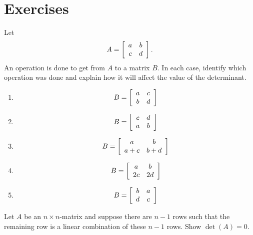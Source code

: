 \documentclass{ximera}
\author{Zack Reed}
\begin{document}
\section*{Exercises}


  Let
  \begin{equation*}
    A = \startmat{cc}
      a & b \\
      c & d \\
    \stopmat.
  \end{equation*}
  An operation is done to get from $A$ to a matrix $B$. In each case,
  identify which operation was done and explain how it will affect the
  value of the determinant.
  \begin{enumerate}
  \item
    \begin{equation*}
      B = \startmat{cc}
        a & c \\
        b & d \\
      \stopmat
    \end{equation*}
  \item
    \begin{equation*}
      B = \startmat{cc}
        c & d \\
        a & b \\
      \stopmat
    \end{equation*}
  \item
    \begin{equation*}
      B = \startmat{cc}
        a   & b   \\
        a+c & b+d \\
      \stopmat
    \end{equation*}
  \item
    \begin{equation*}
      B = \startmat{cc}
        a  & b  \\
        2c & 2d \\
      \stopmat
    \end{equation*}
  \item
    \begin{equation*}
      B = \startmat{cc}
        b & a \\
        d & c \\
      \stopmat
    \end{equation*}
  \end{enumerate}


\begin{example}
  Let $A$ be an $n\times n$-matrix and suppose there are $n-1$ rows
  such that the remaining row is a linear combination of these $n-1$
  rows. Show $\det(A) = 0$.
\end{example}
\end{document}
